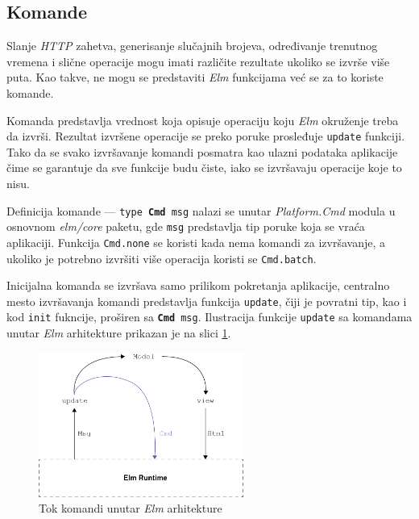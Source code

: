 \documentclass[12pt,oneside]{memoir}
\begin{document}
\subsection{Komande}
Slanje \emph{HTTP} zahetva, generisanje slučajnih brojeva, određivanje trenutnog vremena i slične operacije
mogu imati različite rezultate ukoliko se izvrše više puta. Kao takve, ne mogu se predstaviti \emph{Elm}
funkcijama već se za to koriste komande.

Komanda predstavlja vrednost koja opisuje operaciju koju \emph{Elm} okruženje treba da izvrši.
Rezultat izvršene operacije se preko poruke prosleđuje \texttt{update} funkciji. Tako da se svako
izvršavanje komandi posmatra kao ulazni podataka aplikacije čime se garantuje da sve funkcije budu
čiste, iako se izvršavaju operacije koje to nisu.

Definicija komande --- \texttt{type \textbf{Cmd} msg} nalazi se unutar \emph{Platform.Cmd} modula
u osnovnom \emph{elm/core} paketu, gde \texttt{msg} predstavlja tip poruke koja se vraća aplikaciji.
Funkcija \texttt{Cmd.none} se koristi kada nema komandi za izvršavanje, a ukoliko je potrebno izvršiti
više operacija koristi se \texttt{Cmd.batch}.

Inicijalna komanda se izvršava samo prilikom pokretanja aplikacije, centralno mesto izvršavanja komandi
predstavlja funkcija \texttt{update}, čiji je povratni tip, kao i kod \texttt{init} fukncije, proširen sa \texttt{\textbf{Cmd} msg}.
Ilustracija funkcije \texttt{update} sa komandama unutar \emph{Elm} arhitekture prikazan je na slici \ref{fig:elm-command}.
\begin{figure}[!h]
  \centering
  \includegraphics[width=0.6\textwidth]{elm-command.png}
  \caption{Tok komandi unutar \emph{Elm} arhitekture}
  \label{fig:elm-command}
\end{figure}
\end{document}
